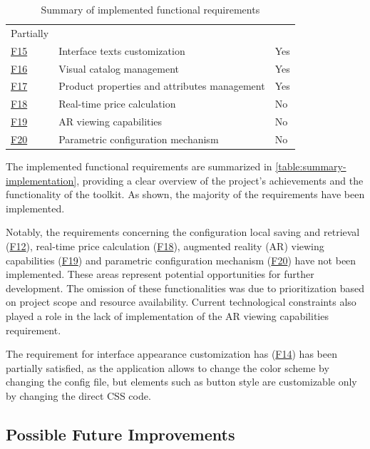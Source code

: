 \begin{table}[htb]
\begin{tabular}{>{\raggedright\arraybackslash}p{0.5cm} >{\raggedright\arraybackslash}p{8cm} >{\centering\arraybackslash}p{2cm}}
    Partially \\
\hyperref[itm:F15]{F15} & Interface texts customization &
    Yes \\
\hyperref[itm:F16]{F16} & Visual catalog management &
    Yes \\
\hyperref[itm:F17]{F17} & Product properties and attributes management &
    Yes \\
\hyperref[itm:F18]{F18} & Real-time price calculation &
    No \\
\hyperref[itm:F19]{F19} & AR viewing capabilities &
    No \\
\hyperref[itm:F20]{F20} & Parametric configuration mechanism &
    No \\
\bottomrule
\end{tabular}
\caption{Summary of implemented functional requirements}
\label{table:summary-implementation}
\end{table}


The implemented functional requirements are summarized in \autoref{table:summary-implementation}, providing a clear overview of the project's achievements and the functionality of the toolkit. As shown, the majority of the requirements have been implemented.

Notably, the requirements concerning the configuration local saving and retrieval (\hyperref[itm:F12]{F12}), real-time price calculation (\hyperref[itm:F18]{F18}), augmented reality (AR) viewing capabilities (\hyperref[itm:F19]{F19}) and parametric configuration mechanism (\hyperref[itm:F20]{F20}) have not been implemented. These areas represent potential opportunities for further development. The omission of these functionalities was due to prioritization based on project scope and resource availability. Current technological constraints also played a role in the lack of implementation of the AR viewing capabilities requirement.

The requirement for interface appearance customization has (\hyperref[itm:F14]{F14}) has been partially satisfied, as the application allows to change the color scheme by changing the config file, but elements such as button style are customizable only by changing the direct CSS code.

\subsection{Possible Future Improvements} \label{section:improvements}

